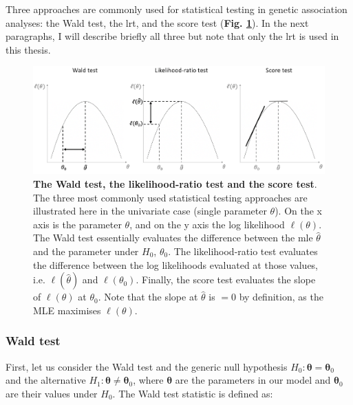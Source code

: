 
\vspace{5mm}

Three approaches are commonly used for statistical testing in genetic association analyses: the Wald test, the \gls{lrt}, and the score test (\textbf{Fig. \ref{fig:hypothesis_tests}}).
In the next paragraphs, I will describe briefly all three but note that only the 
\gls{lrt} is
used in this thesis.

\begin{figure}[h]
\centering
\includegraphics[width=15cm]{Chapter2/Fig/wald_lrt_score_tests.png}
\caption[Wald, LRT and score test]{\textbf{The Wald test, the likelihood-ratio test and the score test}.\\
The three most commonly used statistical testing approaches are illustrated here in the univariate case (single parameter $\theta$). 
On the x axis is the parameter $\theta$, and on the y axis the log likelihood $\ell(\theta)$.
The Wald test essentially evaluates the difference between the \gls{mle} $\hat{\theta}$ and the parameter under $H_0$, $\theta_0$.
The likelihood-ratio test evaluates the difference between the log likelihoods evaluated at those values, i.e. $\ell(\hat{\theta})$ and $\ell(\theta_0)$.
Finally, the score test evaluates the slope of $\ell(\theta)$ at $\theta_0$. Note that the slope at $\hat{\theta}$ is $=0$ by definition, as the MLE maximises $\ell(\theta)$.}
\label{fig:hypothesis_tests}
\end{figure}

\newpage

\subsubsection{Wald test}

First, let us consider the Wald test and the generic null hypothesis $H_0: \boldsymbol{\theta} = \boldsymbol{\theta}_0$ and the alternative $H_1: \boldsymbol{\theta} \neq \boldsymbol{\theta}_0$, where $\boldsymbol{\theta}$ are the parameters in our model and $\boldsymbol{\theta}_0$ are their values under $H_0$.
The Wald test statistic is defined as:

